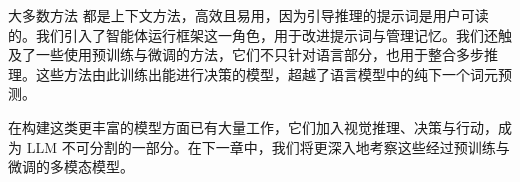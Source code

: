 大多数方法%
都是上下文方法，高效且易用，因为引导推理的提示词是用户可读的。我们引入了智能体运行框架这一角色，用于改进提示词与管理记忆。我们还触及了一些使用预训练与微调的方法，它们不只针对语言部分，也用于整合多步推理。这些方法由此训练出能进行决策的模型，超越了语言模型中的纯下一个词元预测。%

在构建这类更丰富的模型方面已有大量工作，它们加入视觉推理、决策与行动，成为 LLM 不可分割的一部分。在下一章中，我们将更深入地考察这些经过预训练与微调的多模态模型。



